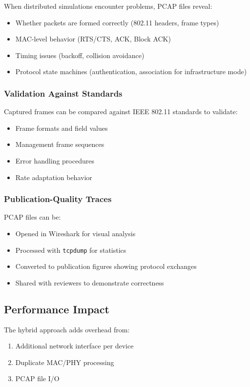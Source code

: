 When distributed simulations encounter problems, PCAP files reveal:
\begin{itemize}
    \item Whether packets are formed correctly (802.11 headers, frame types)
    \item MAC-level behavior (RTS/CTS, ACK, Block ACK)
    \item Timing issues (backoff, collision avoidance)
    \item Protocol state machines (authentication, association for infrastructure mode)
\end{itemize}

\subsubsection{Validation Against Standards}

Captured frames can be compared against IEEE 802.11 standards to validate:
\begin{itemize}
    \item Frame formats and field values
    \item Management frame sequences
    \item Error handling procedures
    \item Rate adaptation behavior
\end{itemize}

\subsubsection{Publication-Quality Traces}

PCAP files can be:
\begin{itemize}
    \item Opened in Wireshark for visual analysis
    \item Processed with \texttt{tcpdump} for statistics
    \item Converted to publication figures showing protocol exchanges
    \item Shared with reviewers to demonstrate correctness
\end{itemize}

\subsection{Performance Impact}

The hybrid approach adds overhead from:
\begin{enumerate}
    \item Additional network interface per device
    \item Duplicate MAC/PHY processing
    \item PCAP file I/O
\end{enumerate}

